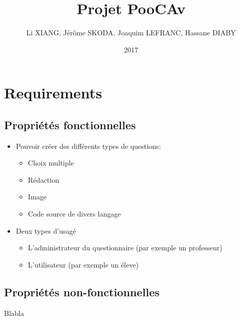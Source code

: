 \documentclass[12pt]{article}
\title{Projet PooCAv}
\author{Li XIANG, Jérôme SKODA, Joaquim LEFRANC, Hassane DIABY}
\date{2017}
\begin{document}
\maketitle
\section{Requirements}

\subsection{Propriétés fonctionnelles}
\begin{itemize}
  \item Pouvoir créer des différents types de questions:
    \begin{itemize}
      \item Choix multiple
      \item Rédaction
      \item Image
      \item Code source de divers langage
    \end{itemize}
  \item Deux types d'usagé
    \begin{itemize}
      \item L'administrateur du questionnaire (par exemple un professeur)
      \item L'utilisateur (par exemple un éleve)
    \end{itemize}






\end{itemize}

\subsection{Propriétés non-fonctionnelles}
Blabla
\end{document}

